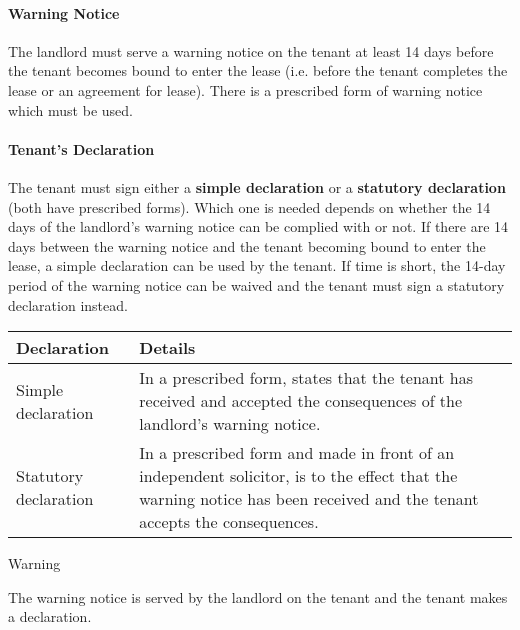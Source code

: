 \documentclass[
]{article}
\newenvironment{env-1183acc6-7dc8-44d4-a985-6dec306e67fd}
{
    \savenotes\tcolorbox[blanker,breakable,left=5pt,borderline west={2pt}{-4pt}{orange}]
}
{
    \endtcolorbox\spewnotes
}
\begin{document}
\hypertarget{warning-notice}{%
\paragraph{Warning Notice}\label{warning-notice}}

The landlord must serve a warning notice on the tenant at least 14 days
before the tenant becomes bound to enter the lease (i.e. before the
tenant completes the lease or an agreement for lease). There is a
prescribed form of warning notice which must be used.

\hypertarget{tenants-declaration}{%
\paragraph{Tenant's Declaration}\label{tenants-declaration}}

The tenant must sign either a \textbf{simple declaration} or a
\textbf{statutory declaration} (both have prescribed forms). Which one
is needed depends on whether the 14 days of the landlord's warning
notice can be complied with or not. If there are 14 days between the
warning notice and the tenant becoming bound to enter the lease, a
simple declaration can be used by the tenant. If time is short, the
14-day period of the warning notice can be waived and the tenant must
sign a statutory declaration instead.

\begin{longtable}[]{@{}ll@{}}
\toprule()
Declaration & Details \\
\midrule()
\endhead
Simple declaration & In a prescribed form, states that the tenant has
received and accepted the consequences of the landlord's warning
notice. \\
Statutory declaration & In a prescribed form and made in front of an
independent solicitor, is to the effect that the warning notice has been
received and the tenant accepts the consequences. \\
\bottomrule()
\end{longtable}

\begin{env-1183acc6-7dc8-44d4-a985-6dec306e67fd}

Warning

The warning notice is served by the landlord on the tenant and the
tenant makes a declaration.

\end{env-1183acc6-7dc8-44d4-a985-6dec306e67fd}
\end{document}
